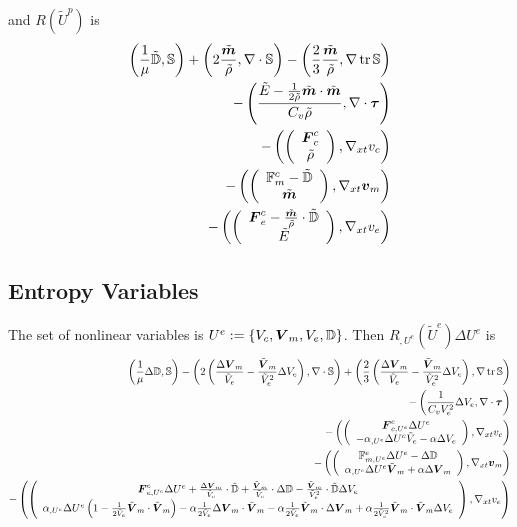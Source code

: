 \documentclass{article}
\begin{document}
and $R(\tilde U^p)$ is
\begin{align*}
	\left( \frac{1}{\mu}\tilde{\mathbb{D}},\mathbb{S} \right)+\left( 2\frac{\tilde{\boldsymbol m}}{\tilde\rho},\nabla\cdot\mathbb{S} \right)
	-\left( \frac{2}{3}\frac{\tilde{\boldsymbol m}}{\tilde\rho},\nabla\operatorname*{tr}{\mathbb{S}} \right)\\
	-\left( \frac{\tilde E-\frac{1}{2\tilde\rho}\tilde{\boldsymbol m}\cdot\tilde{\boldsymbol m}}{C_v\tilde\rho},\nabla\cdot\boldsymbol\tau \right)\\
	-\left( \left( \begin{array}{c} \boldsymbol F^c_c\\ \tilde\rho\\ \end{array} \right),\nabla_{xt} v_c \right)\\
	-\left( \left( \begin{array}{c} \mathbb{F}^c_m-\tilde{\mathbb{D}}\\ \tilde{\boldsymbol m}\\ \end{array} \right),\nabla_{xt}\boldsymbol v_m \right)\\
	-\left( \left( \begin{array}{c} \boldsymbol F^c_e-\frac{\tilde{\boldsymbol m}}{\tilde\rho}\cdot\tilde{\mathbb{D}}\\ \tilde E\\ \end{array} \right),\nabla_{xt} v_e \right)
\end{align*}

\subsection*{Entropy Variables}
The set of nonlinear variables is $U^e:=\left\{ V_c,\boldsymbol V_m,V_e,\mathbb{D} \right\}$.
Then $R_{,U^e}(\tilde U^e)\Delta U^e$ is
\begin{align*}
	\left( \frac{1}{\mu}\Delta\mathbb{D},\mathbb{S} \right)
	-\left( 2\left( \frac{\Delta\boldsymbol V_m}{\tilde V_e}-\frac{\tilde{\boldsymbol V}_m}{\tilde V_e^2}\Delta V_e \right),\nabla\cdot\mathbb{S} \right)
	+\left( \frac{2}{3}\left( \frac{\Delta\boldsymbol V_m}{\tilde V_e}-\frac{\tilde{\boldsymbol V}_m}{\tilde V_e^2}\Delta V_e \right),\nabla\operatorname*{tr}{\mathbb{S}} \right)\\
	-\left( \frac{1}{C_vV_e^2}\Delta V_e,\nabla\cdot\boldsymbol\tau \right)\\
	-\left( \left( \begin{array}{c} \boldsymbol F^e_{c,U^e}\Delta U^e\\ -\alpha_{,U^e}\Delta U^e \tilde V_e-\alpha\Delta V_e\\ \end{array} \right),\nabla_{xt} v_c \right)\\
	-\left( \left( \begin{array}{c} \mathbb{F}^e_{m,U^e}\Delta U^e-\Delta\mathbb{D}\\ \alpha_{,U^e}\Delta U^e\tilde{\boldsymbol V}_m+\alpha\Delta\boldsymbol V_m\\ \end{array} \right),\nabla_{xt}\boldsymbol v_m \right)\\
	-\left( \left( \begin{array}{c} \boldsymbol F^e_{e,U^e}\Delta U^e
	+\frac{\Delta\boldsymbol V_m}{\tilde V_e}\cdot\tilde{\mathbb{D}}
	+\frac{\tilde{\boldsymbol V}_m}{\tilde V_e}\cdot\Delta{\mathbb{D}}
	-\frac{\tilde{\boldsymbol V}_m}{\tilde V_e^2}\cdot\tilde{\mathbb{D}}\Delta V_e
	\\ \alpha_{,U^e}\Delta U^e\left( 1-\frac{1}{2\tilde V_e}\tilde{\boldsymbol V}_m\cdot\tilde{\boldsymbol V}_m \right)
	-\alpha\frac{1}{2\tilde V_e}\Delta\boldsymbol V_m\cdot\tilde{\boldsymbol V}_m
	-\alpha\frac{1}{2\tilde V_e}\tilde{\boldsymbol V}_m\cdot\Delta\boldsymbol V_m
	+\alpha\frac{1}{2\tilde V_e^2}\tilde{\boldsymbol V}_m\cdot\tilde{\boldsymbol V}_m\Delta V_e
	\\ \end{array} \right),\nabla_{xt} v_e \right)
\end{align*}
\end{document}
